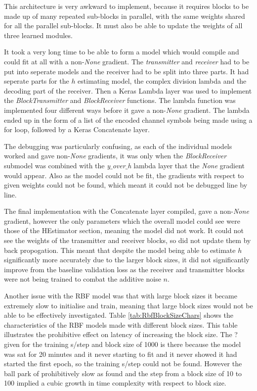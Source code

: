 \documentclass[12pt,onecolumn,letterpaper]{article}
\newcommand{\code}{\textit}
\begin{document}
This architecture is very awkward to implement, because it requires blocks to be made up of many repeated sub-blocks in parallel, with the same weights shared for all the parallel sub-blocks. It must also be able to update the weights of all three learned modules. 

It took a very long time to be able to form a model which would compile and could fit at all with a non-\code{None} gradient. The \code{transmitter} and \code{receiver} had to be put into seperate models and the receiver had to be split into three parts. It had seperate parts for the $h$ estimating model, the complex division lambda and the decoding part of the receiver. Then a Keras Lambda layer was used to implement the \code{BlockTransmitter} and \code{BlockReceiver} functions. The lambda function was implemented four different ways before it gave a non-\code{None} gradient. The lambda ended up in the form of a list of the encoded channel symbols being made using a for loop, followed by a Keras Concatenate layer.

The debugging was particularly confusing, as each of the individual models worked and gave non-\code{None} gradients, it was only when the \code{BlockReceiver} submodel was combined with the \code{y$\_$over$\_$h} lambda layer that the \code{None} gradient would appear. Also as the model could not be fit, the gradients with respect to given weights could not be found, which meant it could not be debugged line by line.

The final implementation with the Concatenate layer compiled, gave a non-\code{None} gradient, however the only parameters which the overall model could see were those of the HEstimator section, meaning the model did not work. It could not see the weights of the transmitter and receiver blocks, so did not update them by back propogation. This meant that despite the model being able to estimate $h$ significantly more accurately due to the larger block sizes, it did not significantly improve from the baseline validation loss as the receiver and transmitter blocks were not being trained to combat the additive noise $n$. 

Another issue with the RBF model was that with large block sizes it became extremely slow to initialise and train, meaning that large block sizes would not be able to be effectively investigated. Table \ref{tab:RbfBlockSizeChars} shows the characteristics of the RBF models made with different block sizes. This table illustrates the prohibitive effect on latency of increasing the block size. The ? given for the training s/step and block size of 1000 is there because the model was sat for 20 minutes and it never starting to fit and it never showed it had started the first epoch, so the training s/step could not be found. However the ball park of prohibitively slow as found and the step from a block size of 10 to 100 implied a cubic growth in time complexity with respect to block size.
\end{document}
